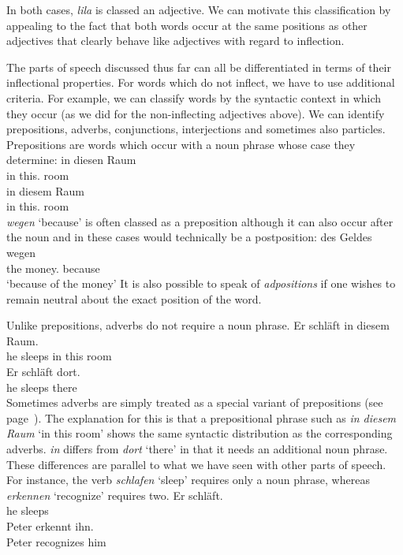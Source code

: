 \noindent
In both cases, \emph{lila} is classed an adjective. We can motivate this classification by appealing to the fact that both words occur
at the same positions as other adjectives that clearly behave like adjectives with regard to inflection.

The parts of speech discussed thus far can all be differentiated in terms of their inflectional properties. For words which do not inflect,
we have to use additional criteria. For example, we can classify words by the syntactic context in which they occur (as we did for the 
non-inflecting adjectives above). We can identify prepositions, adverbs,
conjunctions, interjections and sometimes also particles.
Prepositions are words which occur with a noun phrase whose case they determine:
\eal
\ex 
\gll in diesen Raum\\
	 in this.\acc{} room\\
\ex 
\gll in diesem Raum\\
	 in this.\dat{} room\\
\zl
\emph{wegen} `because' is often classed as a preposition although it can also occur after the noun and in these cases would technically be a
postposition:
\ea
\gll des Geldes wegen\\
	 the money.\gen{} because\\
\glt `because of the money'
\z
It is also possible to speak of \emph{adpositions} if one wishes to remain neutral about the exact position of the word.

Unlike prepositions, adverbs do not require a noun phrase. 
\eal
\ex
\gll Er schläft in diesem Raum.\\
	 he sleeps in this room\\
\ex
\gll Er schläft dort.\\
	 he sleeps there\\
\zl
\addlines
Sometimes adverbs are simply treated as a special variant of prepositions (see page~\pageref{Seite-Adverbien-PP}). The explanation for this is that
a prepositional phrase such as \emph{in diesem Raum} `in this room' shows the same syntactic
distribution as the corresponding adverbs. \emph{in} differs
from \emph{dort} `there' in that it needs an additional noun phrase. These differences are
parallel to what we have seen with other parts of speech. For instance, the verb \emph{schlafen} `sleep' requires only a noun phrase, whereas \emph{erkennen} `recognize' requires two.
\eal
\ex 
\gll Er schläft.\\
     he sleeps\\
\ex 
\gll Peter erkennt ihn.\\
     Peter recognizes him\\
\zl


